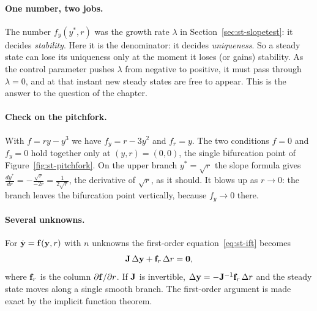 \paragraph{One number, two jobs.}
The number $f_y(y^*,r)$ was the growth rate $\lambda$ in
Section~\ref{sec:st-slopetest}: it decides \emph{stability}. Here it is the
denominator: it decides \emph{uniqueness}. So a steady state can lose its
uniqueness only at the moment it loses (or gains) stability. As the control
parameter pushes $\lambda$ from negative to positive, it must pass through
$\lambda = 0$, and at that instant new steady states are free to appear. This is
the answer to the question of the chapter.

\paragraph{Check on the pitchfork.}
With $f = ry - y^3$ we have $f_y = r - 3y^2$ and $f_r = y$. The two conditions
$f = 0$ and $f_y = 0$ hold together only at $(y,r) = (0,0)$, the single
bifurcation point of Figure~\ref{fig:st-pitchfork}. On the upper branch
$y^* = \sqrt r$ the slope formula gives
$\displaystyle\frac{dy^*}{dr} = -\frac{\sqrt r}{-2r} = \frac{1}{2\sqrt r}$, the
derivative of $\sqrt r$, as it should. It blows up as $r \to 0$: the branch leaves
the bifurcation point vertically, because $f_y \to 0$ there.

\paragraph{Several unknowns.}
For $\dot{\mathbf{y}} = \mathbf{f}(\mathbf{y},r)$ with $n$ unknowns the first-order
equation~\eqref{eq:st-ift} becomes
\begin{equation}\label{eq:st-iftn}
  \mathbf{J}\,\Delta\mathbf{y} + \mathbf{f}_r\,\Delta r = \mathbf{0},
\end{equation}
where $\mathbf{f}_r$ is the column $\partial\mathbf{f}/\partial r$. If $\mathbf{J}$ is
invertible, $\Delta\mathbf{y} = -\mathbf{J}^{-1}\mathbf{f}_r\,\Delta r$ and the steady state
moves along a single smooth branch. The first-order argument is made exact by the
implicit function theorem.

